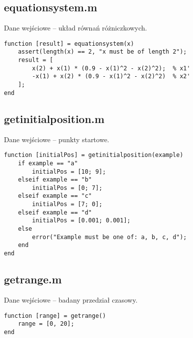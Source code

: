 \documentclass[12pt]{article}
\begin{document}
\subsection{equationsystem.m}
Dane wejściowe -- układ równań różniczkowych.
\begin{verbatim}
function [result] = equationsystem(x)
    assert(length(x) == 2, "x must be of length 2");
    result = [
        x(2) + x(1) * (0.9 - x(1)^2 - x(2)^2);  % x1'
        -x(1) + x(2) * (0.9 - x(1)^2 - x(2)^2)  % x2'
    ];
end
\end{verbatim}

\subsection{getinitialposition.m}
Dane wejściowe -- punkty startowe.
\begin{verbatim}
function [initialPos] = getinitialposition(example)
    if example == "a"
        initialPos = [10; 9];
    elseif example == "b"
        initialPos = [0; 7];
    elseif example == "c"
        initialPos = [7; 0];
    elseif example == "d"
        initialPos = [0.001; 0.001];
    else
        error("Example must be one of: a, b, c, d");
    end
end
\end{verbatim}

\subsection{getrange.m}
Dane wejściowe -- badany przedział czasowy.
\begin{verbatim}
function [range] = getrange()
    range = [0, 20];
end
\end{verbatim}
\end{document}
